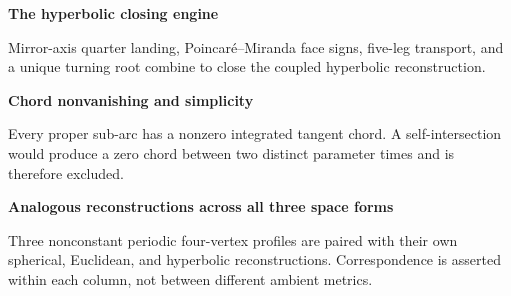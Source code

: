 \documentclass[a4paper,landscape]{article}
\newcommand{\illustrationpage}[3]{%
  \begin{center}
    \vspace*{\fill}
    {\LARGE\bfseries #2\par}
    \vspace{1.25cm}
    \resizebox{0.98\textwidth}{!}{}%
    \vspace{1.1cm}

    \begin{minipage}{0.86\textwidth}
      \centering\large #3
    \end{minipage}
    \vspace*{\fill}
  \end{center}%
}
\begin{document}
\newpage
\illustrationpage{hyperbolic-closing-engine}
  {The hyperbolic closing engine}
  {Mirror-axis quarter landing, Poincaré--Miranda face signs, five-leg
   transport, and a unique turning root combine to close the coupled
   hyperbolic reconstruction.}

\newpage
\illustrationpage{hyperbolic-simplicity}
  {Chord nonvanishing and simplicity}
  {Every proper sub-arc has a nonzero integrated tangent chord. A
   self-intersection would produce a zero chord between two distinct parameter
   times and is therefore excluded.}

\newpage
\illustrationpage{spaceform-unification}
  {Analogous reconstructions across all three space forms}
  {Three nonconstant periodic four-vertex profiles are paired with their own
   spherical, Euclidean, and hyperbolic reconstructions. Correspondence is
   asserted within each column, not between different ambient metrics.}
\end{document}

